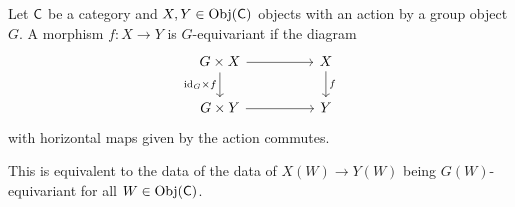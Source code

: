 \begin{definition}[Equivariant]
    Let $\mathsf{C}$ be a category and $X,Y\in\mathrm{Obj}(\mathsf{C})$ objects with an action by a group object $G$. A morphism $f:X\to Y$ is $G$-equivariant if the diagram
    $$%
    \begin{tikzcd}
        {G\times X} && X \\
        {G\times Y} && Y
        \arrow["f", from=1-3, to=2-3]
        \arrow["{\id_{G}\times f}"', from=1-1, to=2-1]
        \arrow[from=1-1, to=1-3]
        \arrow[from=2-1, to=2-3]
    \end{tikzcd}$$
    with horizontal maps given by the action commutes. 
\end{definition}
This is equivalent to the data of the data of $X(W)\to Y(W)$ being $G(W)$-equivariant for all $W\in\mathrm{Obj}(\mathsf{C})$. 